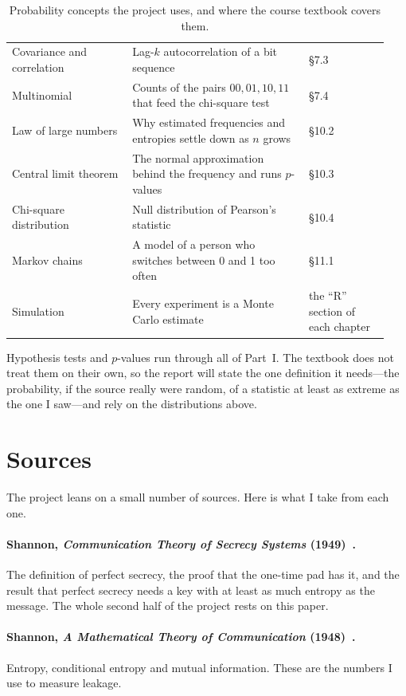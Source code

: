 \begin{table}[htbp]
\begin{tabular}{@{}>{\raggedright\arraybackslash}p{0.30\linewidth}>{\raggedright\arraybackslash}p{0.44\linewidth}>{\raggedright\arraybackslash}p{0.20\linewidth}@{}}
    Covariance and correlation
      & Lag-$k$ autocorrelation of a bit sequence
      & \S7.3 \\
    Multinomial
      & Counts of the pairs $00,01,10,11$ that feed the chi-square test
      & \S7.4 \\
    Law of large numbers
      & Why estimated frequencies and entropies settle down as $n$ grows
      & \S10.2 \\
    Central limit theorem
      & The normal approximation behind the frequency and runs $p$-values
      & \S10.3 \\
    Chi-square distribution
      & Null distribution of Pearson's statistic
      & \S10.4 \\
    Markov chains
      & A model of a person who switches between 0 and 1 too often
      & \S11.1 \\
    Simulation
      & Every experiment is a Monte Carlo estimate
      & the ``R'' section of each chapter \\
    \bottomrule
  \end{tabular}
  \caption{Probability concepts the project uses, and where the course
    textbook covers them.}
  \label{tab:topics}
\end{table}

Hypothesis tests and $p$-values run through all of Part~I. The textbook does
not treat them on their own, so the report will state the one definition it
needs---the probability, if the source really were random, of a statistic at
least as extreme as the one I saw---and rely on the distributions above.

\section{Sources}\label{sec:sources}

The project leans on a small number of sources. Here is what I take from
each one.

\paragraph{Shannon, \emph{Communication Theory of Secrecy Systems}
  (1949)~\cite{shannon1949}.}
The definition of perfect secrecy, the proof that the one-time pad has it,
and the result that perfect secrecy needs a key with at least as much entropy
as the message. The whole second half of the project rests on this paper.

\paragraph{Shannon, \emph{A Mathematical Theory of Communication}
  (1948)~\cite{shannon1948}.}
Entropy, conditional entropy and mutual information. These are the numbers I
use to measure leakage.

